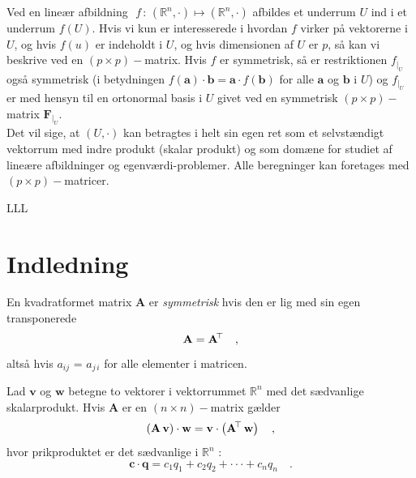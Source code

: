 Ved en lineær afbildning $\,\,f\, : \, (\mathbb{R}^{n}, \cdot) \mapsto (\mathbb{R}^{n}, \cdot)$ afbildes et underrum $U$ ind i et underrum $f(U)$. Hvis vi kun er interesserede i hvordan $f$ virker på vektorerne i $U$, og hvis $f(u)$ er indeholdt i $U$, og hvis dimensionen af $U$ er $p$, så kan vi beskrive  ved en $(p \times p)-$matrix. Hvis $f$ er symmetrisk, så er restriktionen $f_{|_{U}}$ også symmetrisk (i betydningen $f(\mathbf{a}) \cdot \mathbf{b} = \mathbf{a} \cdot f(\mathbf{b}) $ for alle $\mathbf{a}$ og $\mathbf{b}$ i $U$) og $f_{|_{U}}$ er med hensyn til en ortonormal basis i $U$ givet ved en symmetrisk $(p \times p)-$matrix $\mathbf{F}_{|_{U}}$. \\

Det vil sige, at $(U, \cdot)$ kan betragtes i helt sin egen ret som et selvstændigt vektorrum med indre produkt (skalar produkt) og som domæne for studiet af lineære afbildninger og egenværdi-problemer. Alle beregninger kan foretages med $(p \times p)-$matricer.

\begin{example}
LLL
\end{example}



\section{Indledning} \label{secIntro}

\begin{definition}
En kvadratformet matrix $\mathbf{A}$ er {\em{symmetrisk}} hvis den er lig med sin egen transponerede
\begin{equation}
\mathbf{A} = \mathbf{A}\hspace*{-.6mm}^{\top} \quad ,
\end{equation}
altså hvis $a_{ij}$ = $a_{j\,i}$ for alle elementer i matricen.
\end{definition}

\begin{theorem}
Lad $\mathbf{v}$ og $\mathbf{w}$ betegne to vektorer i vektorrummet $\mathbb{R}^{n}$ med det sædvanlige skalarprodukt. Hvis $\mathbf{A}$ er en
$(n \times n)-$matrix gælder
\begin{equation} \label{eqMatDot}
\left(\mathbf{A}\,\mathbf{v} \right)\cdot \mathbf{w} = \mathbf{v} \cdot \left(\mathbf{A}\hspace*{-.6mm}^{\top}\,\mathbf{w}\right) \quad ,
\end{equation}
hvor prikproduktet er det sædvanlige i $\mathbb{R}^{n}\,\,$:
\begin{equation}
\mathbf{c} \cdot \mathbf{q} = c_{1}q_{1} + c_{2}q_{2} + \cdot \cdot \cdot + c_{n}q_{n}
\quad .
\end{equation}
\end{theorem}

